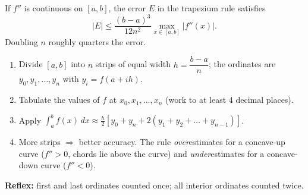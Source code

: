 \documentclass[11pt]{article}
\begin{document}
\begin{propriete}
If $f''$ is continuous on $[a,b]$, the error $E$ in the trapezium rule satisfies
\[
|E| \le \frac{(b-a)^3}{12n^2} \max_{x\in[a,b]} |f''(x)|.
\]
Doubling $n$ roughly quarters the error.
\end{propriete}

\begin{methode}
\begin{enumerate}
\item Divide $[a,b]$ into $n$ strips of equal width $h = \dfrac{b-a}{n}$; the ordinates are $y_0, y_1, \dots, y_n$ with $y_i = f(a+ih)$.
\item Tabulate the values of $f$ at $x_0, x_1, \dots, x_n$ (work to at least 4 decimal places).
\item Apply $\displaystyle\int_a^b f(x)\,dx \approx \frac{h}{2}\left[y_0 + y_n + 2\left(y_1 + y_2 + \dots + y_{n-1}\right)\right]$.
\item More strips $\Rightarrow$ better accuracy. The rule \emph{over}estimates for a concave-up curve ($f''>0$, chords lie above the curve) and \emph{under}estimates for a concave-down curve ($f''<0$).
\end{enumerate}
\textbf{Reflex:} first and last ordinates counted once; all interior ordinates counted twice.
\end{methode}
\end{document}
